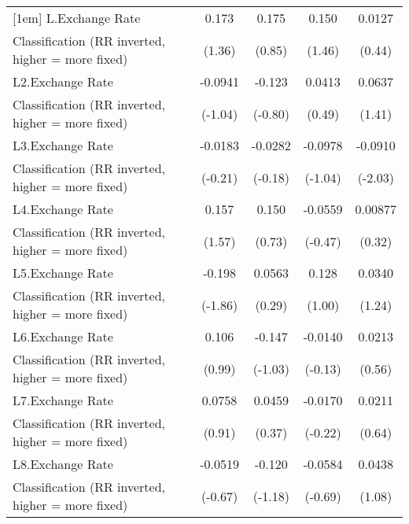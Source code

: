 {\begin{tabular}{l*{4}{c}}
[1em]
L.Exchange Rate     &       0.173         &       0.175         &       0.150         &      0.0127         \\
Classification (RR inverted, higher = more fixed)&      (1.36)         &      (0.85)         &      (1.46)         &      (0.44)         \\
[1em]
L2.Exchange Rate    &     -0.0941         &      -0.123         &      0.0413         &      0.0637         \\
Classification (RR inverted, higher = more fixed)&     (-1.04)         &     (-0.80)         &      (0.49)         &      (1.41)         \\
[1em]
L3.Exchange Rate    &     -0.0183         &     -0.0282         &     -0.0978         &     -0.0910\sym{*}  \\
Classification (RR inverted, higher = more fixed)&     (-0.21)         &     (-0.18)         &     (-1.04)         &     (-2.03)         \\
[1em]
L4.Exchange Rate    &       0.157         &       0.150         &     -0.0559         &     0.00877         \\
Classification (RR inverted, higher = more fixed)&      (1.57)         &      (0.73)         &     (-0.47)         &      (0.32)         \\
[1em]
L5.Exchange Rate    &      -0.198         &      0.0563         &       0.128         &      0.0340         \\
Classification (RR inverted, higher = more fixed)&     (-1.86)         &      (0.29)         &      (1.00)         &      (1.24)         \\
[1em]
L6.Exchange Rate    &       0.106         &      -0.147         &     -0.0140         &      0.0213         \\
Classification (RR inverted, higher = more fixed)&      (0.99)         &     (-1.03)         &     (-0.13)         &      (0.56)         \\
[1em]
L7.Exchange Rate    &      0.0758         &      0.0459         &     -0.0170         &      0.0211         \\
Classification (RR inverted, higher = more fixed)&      (0.91)         &      (0.37)         &     (-0.22)         &      (0.64)         \\
[1em]
L8.Exchange Rate    &     -0.0519         &      -0.120         &     -0.0584         &      0.0438         \\
Classification (RR inverted, higher = more fixed)&     (-0.67)         &     (-1.18)         &     (-0.69)         &      (1.08)         \\

\end{tabular}}
